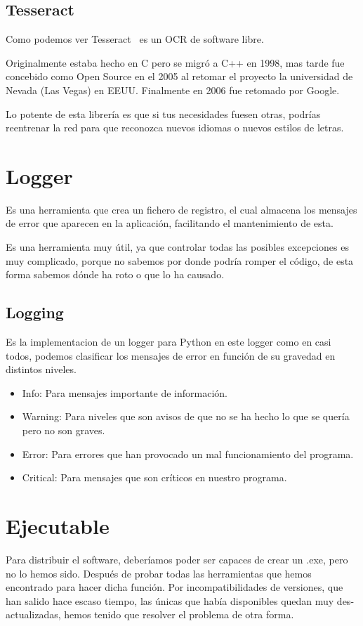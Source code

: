 \subsection{Tesseract}
Como podemos ver Tesseract~\cite{wiki:Tesseract} es un OCR de software libre.

Originalmente estaba hecho en C pero se migró a C++ en 1998, mas tarde fue concebido como Open Source en el 2005 al retomar el proyecto la universidad de Nevada (Las Vegas) en EEUU. Finalmente en 2006 fue retomado por Google.

Lo potente de esta librería es que si tus necesidades fuesen otras, podrías reentrenar la red para que reconozca nuevos idiomas o nuevos estilos de letras.

\section{Logger}
Es una herramienta que crea un fichero de registro, el cual almacena los mensajes de error que aparecen en la aplicación, facilitando el mantenimiento de esta.

Es una herramienta muy útil, ya que controlar todas las posibles excepciones es muy complicado, porque no sabemos por donde podría romper el código, de esta forma sabemos dónde ha roto o que lo ha causado.

\subsection{Logging}
Es la implementacion de un logger para Python \cite{python:logger} en este logger como en casi todos, podemos clasificar los mensajes de error en función de su gravedad en distintos niveles.

\begin{itemize}
\item Info: Para mensajes importante de información.
\item Warning: Para niveles que son avisos de que no se ha hecho lo que se quería pero no son graves.
\item Error: Para errores que han provocado un mal funcionamiento del programa.
\item Critical: Para mensajes que son críticos en nuestro programa.
\end{itemize}

\section{Ejecutable}
Para distribuir el software, deberíamos poder ser capaces de crear un .exe, pero no lo hemos sido.
Después de probar todas las herramientas que hemos encontrado para hacer dicha función. Por incompatibilidades de versiones, que han salido hace escaso tiempo, las únicas que había disponibles quedan muy des-actualizadas, hemos tenido que resolver el problema de otra forma. 

